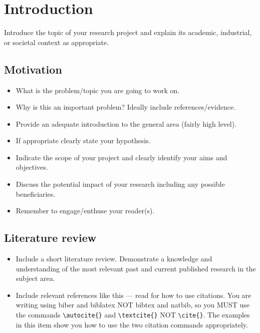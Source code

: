 \documentclass[11pt]{ipp}
\begin{document}

\clearpage
{}
\pagestyle{mainmatter}

\section{Introduction}%
\label{sec:introduction}

Introduce the topic of your research project and explain its academic, industrial, or societal context as appropriate.

\subsection{Motivation}%
\label{sec:motivation}

\begin{itemize}[nosep]
    \item What is the problem/topic you are going to work on.
    \item Why is this an important problem? Ideally include references/evidence.
    \item Provide an adequate introduction to the general area (fairly high level).
    \item If appropriate clearly state your hypothesis.
    \item Indicate the scope of your project and clearly identify your aims and objectives.
    \item Discuss the potential impact of your research including any possible beneficiaries.
    \item Remember to engage/enthuse your reader(s).
\end{itemize}

\subsection{Literature review}%
\label{sec:litreview}

\begin{itemize}[nosep]
    \item Include a short literature review. Demonstrate a knowledge and understanding of the most relevant past and current published research in the subject area. 
    \item Include relevant references like this \autocite{fry2020template} --- read \textcite{coxhead2016referencing} for how to use citations. You are writing using biber and biblatex NOT bibtex and natbib, so you MUST use the commands \verb|\autocite{}| and \verb|\textcite{}| NOT \verb|\cite{}|. The examples in this item show you how to use the two citation commands appropriately.
\end{itemize}
\end{document}
